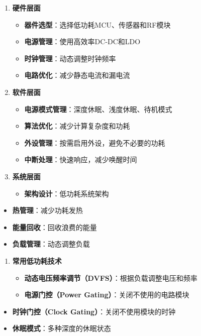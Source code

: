 \documentclass[12pt,UTF8]{ctexbook}
\begin{document}
\begin{enumerate}
    \item \textbf{硬件层面}
    \begin{itemize}
        \item \textbf{器件选型}：选择低功耗MCU、传感器和RF模块
        \item \textbf{电源管理}：使用高效率DC-DC和LDO
        \item \textbf{时钟管理}：动态调整时钟频率
        \item \textbf{电路优化}：减少静态电流和漏电流
    \end{itemize}
    
    \item \textbf{软件层面}
    \begin{itemize}
        \item \textbf{电源模式管理}：深度休眠、浅度休眠、待机模式
        \item \textbf{算法优化}：减少计算复杂度和功耗
        \item \textbf{外设管理}：按需启用外设，避免不必要的功耗
        \item \textbf{中断处理}：快速响应，减少唤醒时间
    \end{itemize}
    
    \item \textbf{系统层面}
    \begin{itemize}
        \item \textbf{架构设计}：低功耗系统架构
    \end{itemize}
\end{enumerate}
\begin{itemize}
    \item \textbf{热管理}：减少功耗发热
    \item \textbf{能量回收}：回收浪费的能量
    \item \textbf{负载管理}：动态调整负载
\end{itemize}

\begin{enumerate}
    \item \textbf{常用低功耗技术}
    \begin{itemize}
        \item \textbf{动态电压频率调节（DVFS）}：根据负载调整电压和频率
        \item \textbf{电源门控（Power Gating）}：关闭不使用的电路模块
    \end{itemize}
\end{enumerate}
\begin{itemize}
    \item \textbf{时钟门控（Clock Gating）}：关闭不使用模块的时钟
    \item \textbf{休眠模式}：多种深度的休眠状态
\end{itemize}
\end{document}
